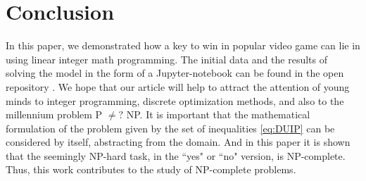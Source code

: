 \documentclass{article}
\begin{document}
\section{Conclusion}
\label{SectionConclusion}
In this paper, we demonstrated how a key to win in popular video game can lie in using linear integer math programming.
The initial data and the results of solving the model in the form of a Jupyter-notebook can be found in the open repository \cite{UnderLordsInput}.
We hope that our article will help to attract the attention of young minds to integer programming, discrete optimization methods, and also to the millennium problem P $ \neq? $ NP.
It is important that the mathematical formulation of the problem given by the set of inequalities \eqref{eq:DUIP} can be considered by itself, abstracting from the domain. And in this paper it is shown that the seemingly NP-hard task, in the ``yes" or ``no" version, is NP-complete.
Thus, this work contributes to the study of NP-complete problems.



\end{document}
